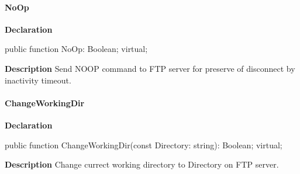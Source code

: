 \documentclass{report}
\newif\ifpdf
\begin{document}
\paragraph*{NoOp}\hspace*{\fill}

\label{ftpsend.TFTPSend-NoOp}
\begin{list}{}{
\setlength{\itemindent}{0cm}
\setlength{\listparindent}{0cm}
\setlength{\leftmargin}{\evensidemargin}
\addtolength{\leftmargin}{\tmplength}
\settowidth{\labelsep}{X}
\addtolength{\leftmargin}{\labelsep}
\setlength{\labelwidth}{\tmplength}
}
\item[\textbf{Declaration}\hfill]
\ifpdf
\begin{flushleft}
\fi
\begin{ttfamily}
public function NoOp: Boolean; virtual;\end{ttfamily}

\ifpdf
\end{flushleft}
\fi

\par
\item[\textbf{Description}]
Send NOOP command to FTP server for preserve of disconnect by inactivity timeout.

\end{list}
\paragraph*{ChangeWorkingDir}\hspace*{\fill}

\label{ftpsend.TFTPSend-ChangeWorkingDir}
\begin{list}{}{
\setlength{\itemindent}{0cm}
\setlength{\listparindent}{0cm}
\setlength{\leftmargin}{\evensidemargin}
\addtolength{\leftmargin}{\tmplength}
\settowidth{\labelsep}{X}
\addtolength{\leftmargin}{\labelsep}
\setlength{\labelwidth}{\tmplength}
}
\item[\textbf{Declaration}\hfill]
\ifpdf
\begin{flushleft}
\fi
\begin{ttfamily}
public function ChangeWorkingDir(const Directory: string): Boolean; virtual;\end{ttfamily}

\ifpdf
\end{flushleft}
\fi

\par
\item[\textbf{Description}]
Change currect working directory to Directory on FTP server.

\end{list}
\end{document}
